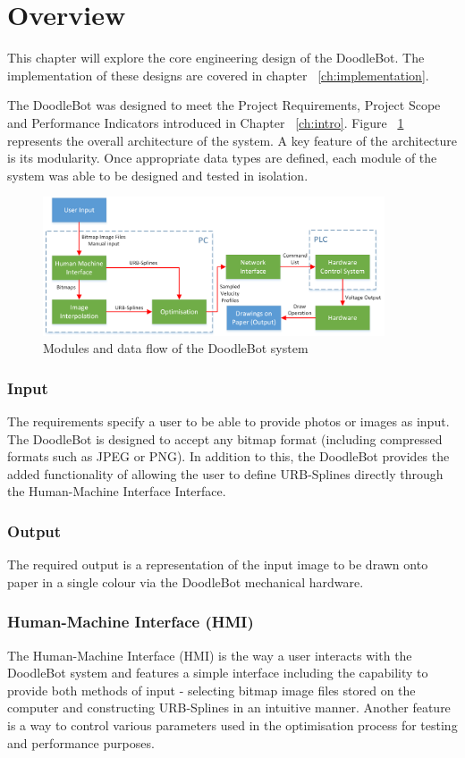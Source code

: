 \section{Overview}
	This chapter will explore the core engineering design of the DoodleBot. The implementation of these designs are covered in chapter ~\ref{ch:implementation}.

	The DoodleBot was designed to meet the Project Requirements, Project Scope and Performance Indicators introduced in Chapter ~\ref{ch:intro}. Figure ~\ref{fig:system} represents the overall architecture of the system. A key feature of the architecture is its modularity. Once appropriate data types are defined, each module of the system was able to be designed and tested in isolation. 
\begin{figure}[h]
\centering
\includegraphics[width=0.9\textwidth]{figures/systemDesign/overview.png}
\caption{Modules and data flow of the DoodleBot system}
\label{fig:system}
\end{figure}

	\subsubsection*{Input}
		The requirements specify a user to be able to provide photos or images as input. The DoodleBot is designed to accept any bitmap format (including compressed formats such as JPEG or PNG). In addition to this, the DoodleBot provides the added functionality of allowing the user to define URB-Splines directly through the Human-Machine Interface Interface.
		
	\subsubsection*{Output}
		The required output is a representation of the input image to be drawn onto paper in a single colour via the DoodleBot mechanical hardware.
		
	\subsubsection*{Human-Machine Interface (HMI)} 
		The Human-Machine Interface (HMI) is the way a user interacts with the DoodleBot system and features a simple interface including the capability to provide both methods of input - selecting bitmap image files stored on the computer and constructing URB-Splines in an intuitive manner. Another feature is a way to control various parameters used in the optimisation process for testing and performance purposes.
		
